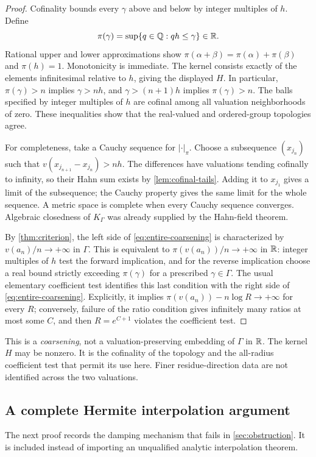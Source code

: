 \documentclass[11pt]{article}
\theoremstyle{plain}
\theoremstyle{plain}
\theoremstyle{plain}
\theoremstyle{definition}
\theoremstyle{definition}
\theoremstyle{definition}
\theoremstyle{remark}
\newcommand{\Q}{\mathbb Q}\newcommand{\Z}{\mathbb Z}\newcommand{\N}{\mathbb N}
\newcommand{\K}{K_\Gamma}\newcommand{\E}{\mathcal E_\Gamma}
\begin{document}
\begin{proof}
Cofinality bounds every $\gamma$ above and below by integer multiples
of $h$. Define
\[
 \pi(\gamma)=\sup\{q\in\Q:qh\le\gamma\}\in\R.
\]
Rational upper and lower approximations show
$\pi(\alpha+\beta)=\pi(\alpha)+\pi(\beta)$ and
$\pi(h)=1$. Monotonicity is immediate. The kernel consists exactly
of the elements infinitesimal relative to $h$, giving the displayed
$H$. In particular, $\pi(\gamma)>n$ implies $\gamma>nh$, and
$\gamma>(n+1)h$ implies $\pi(\gamma)>n$.
The balls specified by integer multiples of $h$ are cofinal among
all valuation neighborhoods of zero. These inequalities show that
the real-valued and ordered-group topologies agree.

For completeness, take a Cauchy sequence for $|\cdot|_\pi$. Choose
a subsequence $(x_{j_n})$ such that
$v(x_{j_{n+1}}-x_{j_n})>nh$. The differences have valuations tending
cofinally to infinity, so their Hahn sum exists by
\cref{lem:cofinal-tails}. Adding it to $x_{j_1}$ gives a limit of the
subsequence; the Cauchy property gives the same limit for the whole
sequence. A metric space is complete when every Cauchy sequence
converges. Algebraic closedness of $\K$ was already supplied by the
Hahn-field theorem.

By \cref{thm:criterion}, the left side of
\eqref{eq:entire-coarsening} is characterized by
$v(a_n)/n\to+\infty$ in $\Gamma$. This is equivalent to
$\pi(v(a_n))/n\to+\infty$ in $\mathbb R$: integer multiples of $h$ test the
forward implication, and for the reverse implication choose a real
bound strictly exceeding $\pi(\gamma)$ for a prescribed
$\gamma\in\Gamma$. The usual elementary coefficient test identifies
this last condition with the right side of
\eqref{eq:entire-coarsening}. Explicitly, it implies
$\pi(v(a_n))-n\log R\to+\infty$ for every $R$; conversely, failure
of the ratio condition gives infinitely many ratios at most some
$C$, and then $R=e^{C+1}$ violates the coefficient test.
\end{proof}

This is a \emph{coarsening}, not a valuation-preserving embedding of
$\Gamma$ in $\mathbb R$. The kernel $H$ may be nonzero. It is the cofinality
of the topology and the all-radius coefficient test that permit its
use here. Finer residue-direction data are not identified across the
two valuations.

\subsection{A complete Hermite interpolation argument}
The next proof records the damping mechanism that fails in
\cref{sec:obstruction}. It is included instead of importing an
unqualified analytic interpolation theorem.
\end{document}
